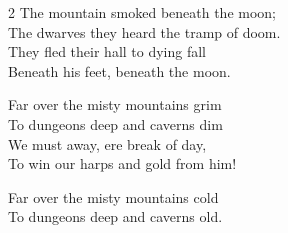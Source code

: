 \begin{multicols}{2}
\ve{}
The mountain smoked beneath the moon;\\
The dwarves they heard the tramp of doom.\\
They fled their hall to dying fall\\
Beneath his feet, beneath the moon.

\ve{}
Far over the misty mountains grim\\
To dungeons deep and caverns dim\\
We must away, ere break of day,\\
To win our harps and gold from him!

\ve{}
Far over the misty mountains cold\\
To dungeons deep and caverns old.


\end{multicols}

\esong{}